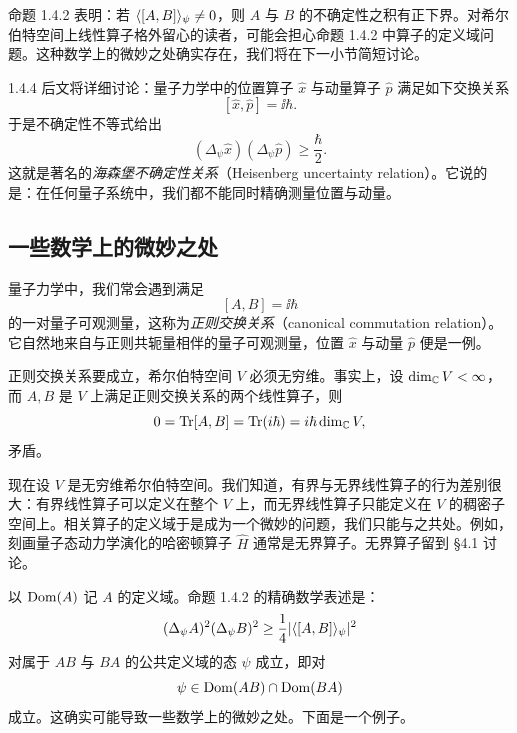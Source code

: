 命题 1.4.2 表明：若 $\langle [A,B]\rangle_{\psi}\ne0$，则 $A$ 与 $B$ 的不确定性之积有正下界。对希尔伯特空间上线性算子格外留心的读者，可能会担心命题 1.4.2 中算子的定义域问题。这种数学上的微妙之处确实存在，我们将在下一小节简短讨论。

\begin{example}{1.4.4}
  后文将详细讨论：量子力学中的位置算子 $\hat x$ 与动量算子 $\hat p$ 满足如下交换关系
  \[
  [\hat x,\hat p]=\ii\hbar.
  \]
  于是不确定性不等式给出
  \[
  (\Delta_{\psi}\hat x)(\Delta_{\psi}\hat p)\ge\frac{\hbar}{2}.
  \]
  这就是著名的\emph{海森堡不确定性关系}（Heisenberg uncertainty relation）。它说的是：在任何量子系统中，我们都不能同时精确测量位置与动量。
\end{example}

\subsection{一些数学上的微妙之处}

量子力学中，我们常会遇到满足
\[
[A,B]=\ii\hbar
\]
的一对量子可观测量，这称为\emph{正则交换关系}（canonical commutation relation）。它自然地来自与正则共轭量相伴的量子可观测量，位置 $\hat x$ 与动量 $\hat p$ 便是一例。

正则交换关系要成立，希尔伯特空间 $V$ 必须无穷维。事实上，设 $\dim_{\mathbb{C}}V<\infty$，而 $A,B$ 是 $V$ 上满足正则交换关系的两个线性算子，则
\[
0=\operatorname{Tr}[A,B]=\operatorname{Tr}(i\hbar)=i\hbar\dim_{\mathbb{C}}V,
\]
矛盾。

现在设 $V$ 是无穷维希尔伯特空间。我们知道，有界与无界线性算子的行为差别很大：有界线性算子可以定义在整个 $V$ 上，而无界线性算子只能定义在 $V$ 的稠密子空间上。相关算子的定义域于是成为一个微妙的问题，我们只能与之共处。例如，刻画量子态动力学演化的哈密顿算子 $\hat H$ 通常是无界算子。无界算子留到 §4.1 讨论。

以 $\operatorname{Dom}(A)$ 记 $A$ 的定义域。命题 1.4.2 的精确数学表述是：
\[
(\Delta_{\psi}A)^2(\Delta_{\psi}B)^2\ge\frac14\lvert \langle [A,B]\rangle_{\psi}\rvert^2
\]
对属于 $AB$ 与 $BA$ 的公共定义域的态 $\psi$ 成立，即对
\[
\psi\in\operatorname{Dom}(AB)\cap\operatorname{Dom}(BA)
\]
成立。这确实可能导致一些数学上的微妙之处。下面是一个例子。

